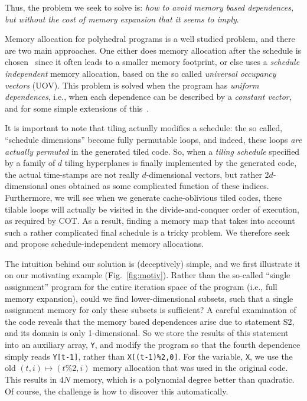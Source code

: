 Thus, the problem we seek to solve is: \emph{how to avoid memory based
  dependences, but without the cost of memory expansion that it seems to
  imply}.

Memory allocation for polyhedral programs is a well studied problem, and there
are two main approaches.  One either does memory allocation after the schedule is
chosen~\cite{sanjay-europar96, degreef-memory97, lefebvre-feautrier-pc98,
  sanjay-toplas00, darte-lattice05, vasilache-impact12,
  bhaskaracharya-toplas16, bhaskaracharya-popl16} since it often leads to a
smaller memory footprint, or else uses a \emph{schedule independent} memory
allocation, based on the so called \emph{universal occupancy vectors} (UOV).
This problem is solved when the program has \emph{uniform dependences}, i.e.,
when each dependence can be described by a \emph{constant vector}, and for some
simple extensions of this~\cite{strout-etal-asplos98, sanjay-memory-2011}.

It is important to note that tiling actually modifies a schedule: the so
called, ``schedule dimensions'' become fully permutable loops, and indeed,
these loops \emph{are actually permuted} in the generated tiled code.  So,
when a \emph{tiling schedule} specified by a family of $d$ tiling hyperplanes
is finally implemented by the generated code, the actual time-stamps are not
really $d$-dimensional vectors, but rather $2d$-dimensional ones obtained as
some complicated function of these indices.  Furthermore, we will see when we
generate cache-oblivious tiled codes, these tilable loops will actually be
visited in the divide-and-conquer order of execution, as required by COT.  As
a result, finding a memory map that takes into account such a rather
complicated final schedule is a tricky problem.  We therefore seek and propose
schedule-independent memory allocations.

The intuition behind our solution is (deceptively) simple, and we first
illustrate it on our motivating example (Fig.~\ref{fig:motiv}).  Rather than
the so-called ``single assignment'' program for the entire iteration space of
the program (i.e., full memory expansion), could we find lower-dimensional
subsets, such that a single assignment memory for only these subsets is
sufficient?  A careful examination of the code reveals that the memory based
dependences arise due to statement S2, and its domain is only 1-dimensional.
So we store the results of this statement into an auxiliary array, \texttt{Y},
and modify the program so that the fourth dependence simply reads
\texttt{Y[t-1]}, rather than \texttt{X[(t-1)\%2,0]}.  For the variable,
\texttt{X}, we use the old $(t,i) \mapsto (t\%2,i)$ memory allocation that was
used in the original code.  This results in $4N$ memory, which is a polynomial
degree better than quadratic.  Of course, the challenge is how to discover
this automatically.

